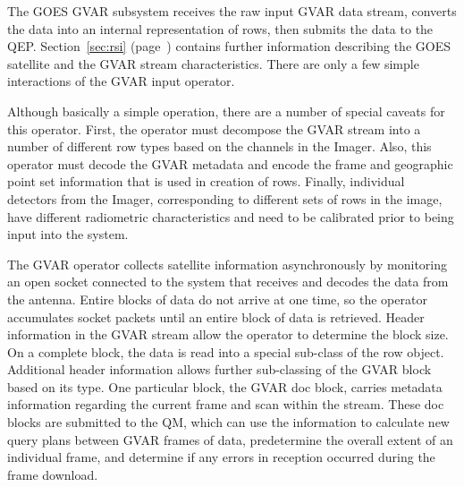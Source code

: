 \documentclass{ucdthesis}       %
\begin{document}
The \ac{GOES} \ac{GVAR} subsystem receives the raw input \ac{GVAR}
data stream, converts the data into an internal representation of
rows, then submits the data to the \ac{QEP}.  Section~\ref{sec:rsi}
(page~\pageref{sec:rsi}) contains further information describing the
\ac{GOES} satellite and the \ac{GVAR} stream characteristics.  There
are only a few simple interactions of the \ac{GVAR} input operator.

%
%  

Although basically a simple operation, there are a number of special
caveats for this operator.  First, the operator must decompose the
\ac{GVAR} stream into a number of different row types based on the
channels in the Imager.  Also, this operator must decode the \ac{GVAR}
metadata and encode the frame and geographic point set information
that is used in creation of rows. Finally, individual detectors from the
Imager, corresponding to different sets of rows in the image, have
different radiometric characteristics and need to be calibrated prior
to being input into the system.


The \ac{GVAR} operator collects satellite information asynchronously
by monitoring an open socket connected to the system that receives and
decodes the data from the antenna.  Entire blocks of data do not
arrive at one time, so the operator accumulates socket packets until
an entire block of data is retrieved.  Header information in the
\ac{GVAR} stream allow the operator to determine the block size.  On a
complete block, the data is read into a special sub-class of the row
object.  Additional header information allows further sub-classing of
the \ac{GVAR} block based on its type.  One particular block, the
\ac{GVAR} doc block, carries metadata information regarding the
current frame and scan within the stream.  These doc blocks are
submitted to the \ac{QM}, which can use the information to calculate
new query plans between \ac{GVAR} frames of data, predetermine the
overall extent of an individual frame, and determine if any errors in
reception occurred during the frame download.
\end{document}
